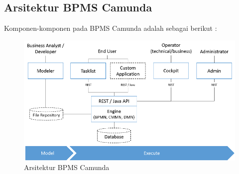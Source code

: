 \subsection{Arsitektur BPMS Camunda}
\label{arsitekturcamunda}
Komponen-komponen pada BPMS Camunda adalah sebagai berikut :
\begin{figure}[H]
	\centering
	\includegraphics[scale=0.7]{Gambar/Bab-2/bpms/arsitektur-camunda}
	\caption{Arsitektur BPMS Camunda} 
	\label{fig:arsitekturcamunda}
\end{figure}

